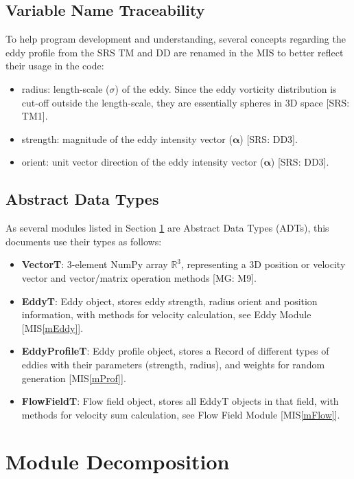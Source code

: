 \documentclass[12pt, titlepage]{article}
\begin{document}
\subsection{Variable Name Traceability}
To help program development and understanding, several concepts regarding the eddy profile from the SRS TM and DD are renamed in the MIS to better reflect their usage in the code:
\begin{itemize}
  \item radius: length-scale ($\sigma$) of the eddy. Since the eddy vorticity distribution is cut-off outside the length-scale, they are essentially spheres in 3D space [SRS: TM1].
  \item strength: magnitude of the eddy intensity vector ($\boldsymbol{\alpha}$) [SRS: DD3].
  \item orient: unit vector direction of the eddy intensity vector ($\boldsymbol{\alpha}$) [SRS: DD3].
\end{itemize}

\subsection{Abstract Data Types}

As several modules listed in Section \ref{SecMD} are Abstract Data Types (ADTs), this documents use their types as follows:
\begin{itemize}
  \item \textbf{VectorT}: 3-element NumPy array $\mathbb{R}^3$, representing a 3D position or velocity vector and vector/matrix operation methods [MG: M9].
  \item \textbf{EddyT}: Eddy object, stores eddy strength, radius orient and position information, with methods for velocity calculation, see Eddy Module [MIS\ref{mEddy}].
  \item \textbf{EddyProfileT}: Eddy profile object, stores a Record of different types of eddies with their parameters (strength, radius), and weights for random generation [MIS\ref{mProf}].
  \item \textbf{FlowFieldT}: Flow field object, stores all EddyT objects in that field, with methods for velocity sum calculation, see Flow Field Module [MIS\ref{mFlow}].
\end{itemize}

\section{Module Decomposition} \label{SecMD}
\end{document}
